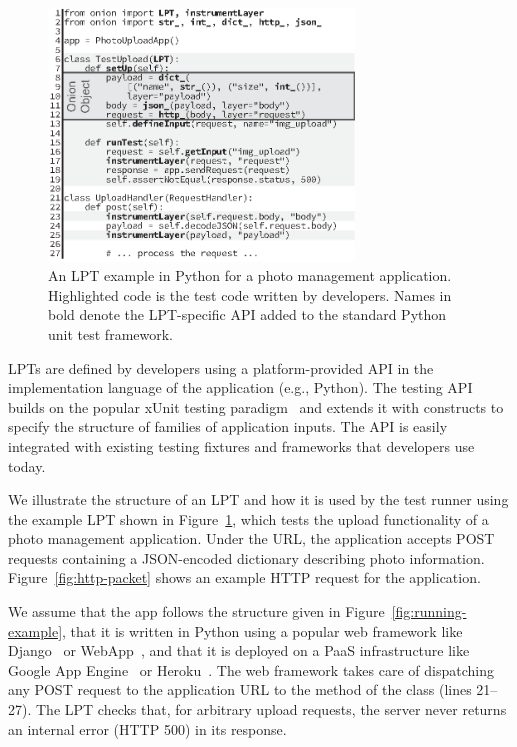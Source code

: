 \begin{figure}
  \centering
  \includegraphics[width=3.2in]{paas/figures/overlay}
  \caption{An LPT example in Python for a photo management application.  Highlighted code is the test code written by developers.  Names in bold denote the LPT-specific API added to the standard Python unit test framework.}
  \label{fig:test-lpt}
\end{figure}

 LPTs are defined by developers using a platform-provided API in the implementation language of the application (e.g., Python).  The testing API builds on the popular xUnit testing paradigm~\cite{xunit} and extends it with constructs to specify the structure of families of application inputs.  The API is easily integrated with existing testing fixtures and frameworks that developers use today.

We illustrate the structure of an LPT and how it is used by the test runner using the example LPT  shown in Figure~\ref{fig:test-lpt}, which tests the upload functionality of a photo management application.  Under the  URL, the application accepts POST requests containing a JSON-encoded dictionary describing photo information.  Figure~\ref{fig:http-packet} shows an example HTTP request for the application.

We assume that the app follows the structure given in Figure~\ref{fig:running-example}, that it is written in Python using a popular web framework like Django~\cite{py-django} or WebApp~\cite{webapp2}, and that it is deployed on a PaaS infrastructure like Google App Engine~\cite{google-gae} or Heroku~\cite{heroku}.  The web framework takes care of dispatching any POST request to the  application URL to the  method of the  class (lines 21--27).
%
The  LPT checks that, for arbitrary upload requests, the server never returns an internal error (HTTP 500) in its response.


